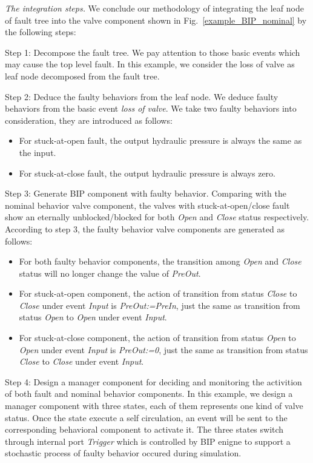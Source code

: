 \emph{The integration steps.} We conclude our methodology of integrating the leaf node of fault tree into the valve component shown in Fig.~\ref{example_BIP_nominal} by the following steps:

Step 1: Decompose the fault tree. We pay attention to those basic events which may cause the top level fault. In this example, we consider the loss of valve as leaf node decomposed from the fault tree.

Step 2: Deduce the faulty behaviors from the leaf node. 
We deduce faulty behaviors from the basic event \emph{loss of valve}. We take two faulty behaviors into consideration, they are introduced as follows:

\begin{itemize}
	\item For stuck-at-open fault, the output hydraulic pressure is always the same as the input.
	\item For stuck-at-close fault, the output hydraulic pressure is always zero.
\end{itemize}

Step 3: Generate BIP component with faulty behavior. Comparing with the nominal behavior valve component, the valves with stuck-at-open/close fault show an eternally unblocked/blocked for both \emph{Open} and \emph{Close} status respectively. According to step 3, the faulty behavior valve components are generated as follows:

\begin{itemize}
	\item For both faulty behavior components, the transition among \emph{Open} and \emph{Close} status will no longer change the value of \emph{PreOut}.
	\item For stuck-at-open component, the action of transition from status \emph{Close} to \emph{Close} under event \emph{Input} is \emph{PreOut:=PreIn}, just the same as transition from status \emph{Open} to \emph{Open} under event \emph{Input}.
	\item For stuck-at-close component, the action of transition from status \emph{Open} to \emph{Open} under event \emph{Input} is \emph{PreOut:=0}, just the same as transition from status \emph{Close} to \emph{Close} under event \emph{Input}.
\end{itemize}

Step 4: Design a manager component for deciding and monitoring the activition of both fault and nominal behavior components. In this example, we design a manager component with three states, each of them represents one kind of valve status. Once the state execute a self circulation, an event will be sent to the corresponding behavioral component to activate it. The three states switch through internal port \emph{Trigger} which is controlled by BIP enigne to support a stochastic process of faulty behavior occured during simulation.

